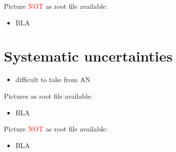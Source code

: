 Picture \textcolor{red}{NOT} as root file available:
\begin{itemize}
\item BLA
\end{itemize}

\chapter{Systematic uncertainties}

\begin{itemize}
\item difficult to take from AN
\end{itemize}

Pictures as root file available:
\begin{itemize}
\item BLA
\end{itemize}

Picture \textcolor{red}{NOT} as root file available:
\begin{itemize}
\item BLA
\end{itemize}

